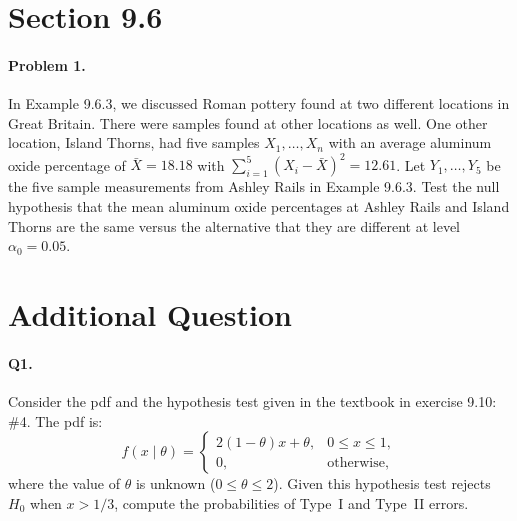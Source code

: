 \documentclass[11pt]{article}
\begin{document}
\section*{Section 9.6}

\paragraph{Problem 1.}
In Example 9.6.3, we discussed Roman pottery found at two different locations in
Great Britain. There were samples found at other locations as well. One other
location, Island Thorns, had five samples $X_1, \dots, X_n$ with an average
aluminum oxide percentage of $\bar{X} = 18.18$ with
$\sum_{i=1}^{5}(X_i - \bar{X})^2 = 12.61$. Let $Y_1, \dots, Y_5$ be the five sample
measurements from Ashley Rails in Example 9.6.3. Test the null hypothesis that the
mean aluminum oxide percentages at Ashley Rails and Island Thorns are the same
versus the alternative that they are different at level $\alpha_0 = 0.05$.

\section*{Additional Question}

\paragraph{Q1.}
Consider the pdf and the hypothesis test given in the textbook in exercise 9.10: \#4.
The pdf is:
\[
    f(x \mid \theta) =
    \begin{cases}
        2(1-\theta)x + \theta, & 0 \leq x \leq 1, \\
        0, & \text{otherwise},
    \end{cases}
\]
where the value of $\theta$ is unknown ($0 \leq \theta \leq 2$). Given this
hypothesis test rejects $H_0$ when $x > 1/3$, compute the probabilities of Type~I
and Type~II errors.
\end{document}
